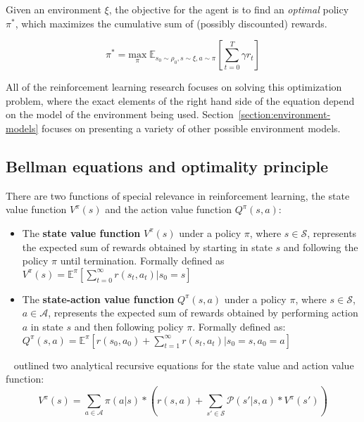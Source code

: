 \documentclass{../main.tex}{}
\begin{document}
Given an environment $\xi$, the objective for the agent is to find an \textit{optimal} policy $\pi^*$, which maximizes the cumulative sum of (possibly discounted) rewards.

\begin{equation}
    \pi^{*} = \underset{\pi}{\text{max}}\;  \mathbb{E}_{s_0 \sim \rho_0, s \sim \xi, a \sim \pi}[\sum_{t=0}^{T} \gamma r_t]
    \label{equation:expected-cumulative-reward}
\end{equation}

All of the reinforcement learning research focuses on solving this optimization problem, where the exact elements of the right hand side of the equation depend on the model of the environment being used. Section~\ref{section:environment-models} focuses on presenting a variety of other possible environment models.

\subsection{Bellman equations and optimality principle}

There are two functions of special relevance in reinforcement learning, the state value function $V^{\pi}(s)$ and the action value function $Q^{\pi}(s, a)$:
\begin{itemize}
    \item The \textbf{state value function} $V^{\pi}(s)$ under a policy $\pi$, where $s \in \mathcal{S}$, represents the expected sum of rewards obtained by starting in state $s$ and following the policy $\pi$ until termination. Formally defined as $V^{\pi}(s) = \mathbb{E}^{\pi}[\sum^{\infty}_{t=0} r(s_t, a_t) | s_0 = s] $
    \item The \textbf{state-action value function} $Q^{\pi}(s, a)$ under a policy $\pi$, where $s \in \mathcal{S}$, $a \in \mathcal{A}$, represents the expected sum of rewards obtained by performing action $a$ in state $s$ and then following policy $\pi$. Formally defined as: $Q^{\pi}(s, a) = \mathbb{E}^{\pi}[r(s_0, a_0) + \sum^{\infty}_{t=1} r(s_t, a_t) | s_0 = s, a_0 = a]$
\end{itemize}

~\cite{Bellman1957} outlined two analytical recursive equations for the state value and action value function:
\begin{equation}\label{equation:bellman:state-value-function}
V^{\pi}(s) = \sum_{a \in \mathcal{A}} \pi(a | s) * (r(s, a) + \sum_{s' \in \mathcal{S}} \mathcal{P}(s' | s, a) * V^{\pi}(s'))
\end{equation}
\end{document}
